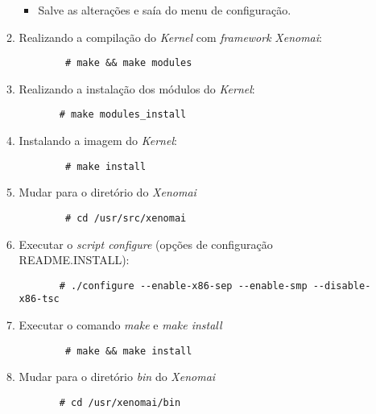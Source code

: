 \documentclass[a4paper,10pt]{article}
\begin{document}
\begin{enumerate}
\begin{enumerate}
\begin{itemize}
\begin{itemize}
\begin{itemize}
		    \end{itemize}
		\end{itemize}
	      \item Salve as alterações e saía do menu de configuração.
	  \end{itemize}

	\item Realizando a compilação do \emph{Kernel} com \emph{framework} \emph{Xenomai}:
	  \begin{lstlisting}
	    # make && make modules
	  \end{lstlisting}

	\item Realizando a instalação dos módulos do \emph{Kernel}:
	  \begin{lstlisting}
	   # make modules_install
	  \end{lstlisting}

	\item Instalando a imagem do \emph{Kernel}:
	  \begin{lstlisting}
	    # make install
	  \end{lstlisting}

	\item Mudar para o diretório do \emph{Xenomai}
	  \begin{lstlisting}
	    # cd /usr/src/xenomai
	  \end{lstlisting}

	\item Executar o \emph{script configure} (opções de configuração README.INSTALL):
	  \begin{lstlisting}
	   # ./configure --enable-x86-sep --enable-smp --disable-x86-tsc
	  \end{lstlisting}

	\item Executar o comando \emph{make} e \emph{make install}
	  \begin{lstlisting}
	    # make && make install
	  \end{lstlisting}

	\item Mudar para o diretório \emph{bin} do \emph{Xenomai}
	  \begin{lstlisting}
	   # cd /usr/xenomai/bin
	  \end{lstlisting}    

      \end{enumerate}  


\end{enumerate}
\end{document}

